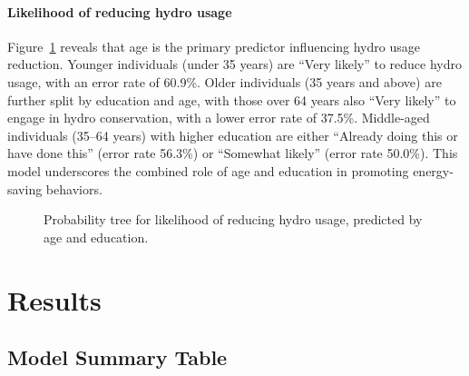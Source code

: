 \documentclass[
  letterpaper,
  DIV=11,
  numbers=noendperiod]{scrartcl}
\let\oldparagraph\paragraph
\renewcommand{\paragraph}[1]{\oldparagraph{#1}\mbox{}}
\begin{document}
\paragraph{Likelihood of reducing hydro
usage}\label{likelihood-of-reducing-hydro-usage}

Figure~\ref{fig-eighteen} reveals that age is the primary predictor
influencing hydro usage reduction. Younger individuals (under 35 years)
are ``Very likely'' to reduce hydro usage, with an error rate of 60.9\%.
Older individuals (35 years and above) are further split by education
and age, with those over 64 years also ``Very likely'' to engage in
hydro conservation, with a lower error rate of 37.5\%. Middle-aged
individuals (35--64 years) with higher education are either ``Already
doing this or have done this'' (error rate 56.3\%) or ``Somewhat
likely'' (error rate 50.0\%). This model underscores the combined role
of age and education in promoting energy-saving behaviors.

\begin{figure}


\caption{\label{fig-eighteen}Probability tree for likelihood of reducing
hydro usage, predicted by age and education.}

\end{figure}%

\section{Results}\label{sec-results}

\subsection{Model Summary Table}\label{model-summary-table}
\end{document}
